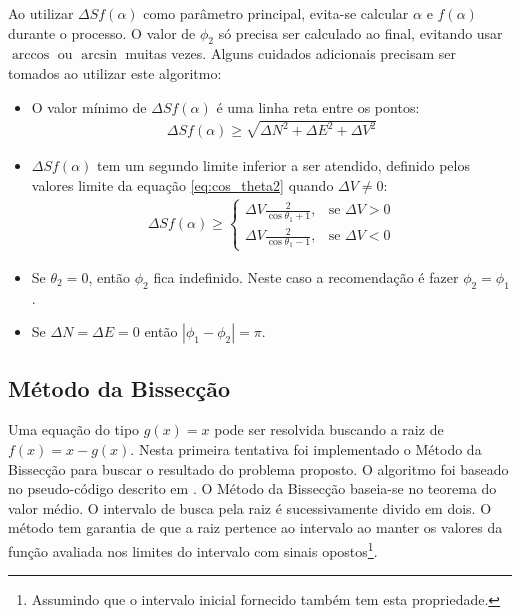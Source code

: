 \documentclass[final,3p,12pt]{elsarticle}
\begin{document}
Ao utilizar $\Delta S f(\alpha)$ como parâmetro principal, evita-se calcular $\alpha$ e $f(\alpha)$ durante o processo. O valor de $\phi_2$ só precisa ser calculado ao final, evitando usar $\arccos$ ou $\arcsin$ muitas vezes. Alguns cuidados adicionais precisam ser tomados ao utilizar este algoritmo:

\begin{itemize}
    \item O valor mínimo de $\Delta S f(\alpha)$ é uma linha reta entre os pontos:
    \begin{align*}
        \Delta S f(\alpha) \geq \sqrt{\Delta N^2 + \Delta E^2 + \Delta V^2}
    \end{align*}
    \item $\Delta S f(\alpha)$ tem um segundo limite inferior a ser atendido, definido pelos valores limite da equação \ref{eq:cos_theta2} quando $\Delta V \neq 0$:
    \begin{align*}
        \Delta S f(\alpha) \geq \begin{cases}
            \Delta V \frac{2}{\cos \theta_1+1},&\text{se } \Delta V > 0 \\
            \Delta V \frac{2}{\cos \theta_1-1},&\text{se } \Delta V < 0  
        \end{cases}
    \end{align*}
    \item Se $\theta_2 = 0$, então $\phi_2$ fica indefinido. Neste caso a recomendação é fazer $\phi_2 = \phi_1$. 
    \item Se $\Delta N = \Delta E = 0$ então $|\phi_1 - \phi_2| = \pi$.
\end{itemize}

    \subsection{Método da Bissecção} \label{sec:mcm}
    
    Uma equação do tipo $g(x)=x$ pode ser resolvida buscando a raiz de $f(x) = x - g(x)$. Nesta primeira tentativa foi implementado o Método da Bissecção para buscar o resultado do problema proposto. O algoritmo foi baseado no pseudo-código descrito em \cite{burden2016analise}. O Método da Bissecção baseia-se no teorema do valor médio. O intervalo de busca pela raiz é sucessivamente divido em dois. O método tem garantia de que a raiz pertence ao intervalo ao manter os valores da função avaliada nos limites do intervalo com sinais opostos\footnote{Assumindo que o intervalo inicial fornecido também tem esta propriedade.}. 
\end{document}

